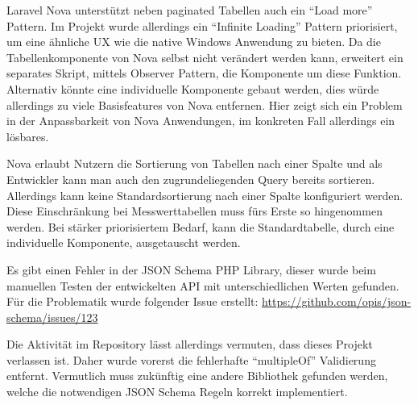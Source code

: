 \newpage

Laravel Nova unterstützt neben paginated Tabellen auch ein \enquote{Load more} Pattern.
Im Projekt wurde allerdings ein \enquote{Infinite Loading} Pattern priorisiert, um eine ähnliche UX wie die native Windows Anwendung zu bieten.
Da die Tabellenkomponente von Nova selbst nicht verändert werden kann, erweitert ein separates Skript, mittels Observer Pattern, die Komponente um diese Funktion.
Alternativ könnte eine individuelle Komponente gebaut werden, dies würde allerdings zu viele Basisfeatures von Nova entfernen.
Hier zeigt sich ein Problem in der Anpassbarkeit von Nova Anwendungen, im konkreten Fall allerdings ein lösbares.

Nova erlaubt Nutzern die Sortierung von Tabellen nach einer Spalte und als Entwickler kann man auch den zugrundeliegenden Query bereits sortieren.
Allerdings kann keine Standardsortierung nach einer Spalte konfiguriert werden.
Diese Einschränkung bei Messwerttabellen muss fürs Erste so hingenommen werden.
Bei stärker priorisiertem Bedarf, kann die Standardtabelle, durch eine individuelle Komponente, ausgetauscht werden.

Es gibt einen Fehler in der JSON Schema PHP Library, dieser wurde beim manuellen Testen der entwickelten API mit unterschiedlichen Werten gefunden.
Für die Problematik wurde folgender Issue erstellt: \url{https://github.com/opis/json-schema/issues/123}

Die Aktivität im Repository lässt allerdings vermuten, dass dieses Projekt verlassen ist.
Daher wurde vorerst die fehlerhafte \enquote{multipleOf} Validierung entfernt.
Vermutlich muss zukünftig eine andere Bibliothek gefunden werden, welche die notwendigen JSON Schema Regeln korrekt implementiert.
